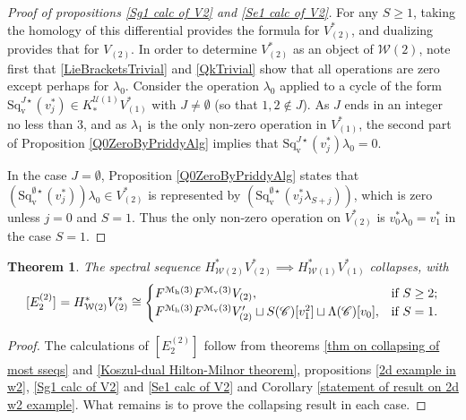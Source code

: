 \documentclass[11pt]{amsart} \renewcommand{\baselinestretch}{1.2}
\theoremstyle{plain}
\newtheorem{thm}{Theorem}[section] %
\numberwithin{equation}{section} %
\theoremstyle{plain}
\newtheorem{thm}{Theorem}[chapter] %
\numberwithin{equation}{chapter} %
\newcommand{\scrC}{\mathscr{C}}
\newcommand{\calU}{\mathcal{U}}
\newcommand{\calw}{\mathcal{W}}
\newcommand{\calmv}{\mathcal{M}\dver}
\newcommand{\calmh}{\mathcal{M}\dhor}
\newcommand{\CommOperad}{{\scrC}}
\newcommand{\E}[5]{[E^{#1}_{#2}#3]^{#4}_{#5}}
\newcommand{\dver}{_\mathrm{v}}
\newcommand{\dhor}{_\mathrm{h}}
\newcommand{\Sqvstar}[1]{\mathrm{Sq}\dver^{#1\star}}
\begin{document}
\begin{Calculations of HWn}
\begin{proof}[Proof of propositions \ref{Sg1 calc of V2} and \ref{Se1 calc of V2}]
For any $S\geq1$, taking the homology of this differential provides the formula for $V^*_{(2)}$, and dualizing provides that for $V_{(2)}$.
In order to determine $V^*_{(2)}$ as an object of $\calw(2)$, note first that \ref{LieBracketsTrivial} and \ref{QkTrivial} show that all operations are zero except perhaps for $\lambda_0$. %
Consider the operation $\lambda_0$ applied to a cycle of the form $\Sqvstar{J}(v_{j}^*)\in K_{*}^{\calU(1)}V^*_{(1)}$ with $J\neq\emptyset$ (so that $1,2\notin J$). As $J$ ends in an integer no less than 3, and as $\lambda_1$ is the only non-zero operation in $V^*_{(1)}$, the second part of Proposition \ref{Q0ZeroByPriddyAlg} implies that $\Sqvstar{J}(v_{j}^*)\lambda_0=0$.

In the case $J=\emptyset$, Proposition \ref{Q0ZeroByPriddyAlg} states that $(\Sqvstar{\emptyset}(v_{j}^*))\lambda_0\in V^*_{(2)}$ is represented by $(\Sqvstar{\emptyset}(v_{j}^*\lambda_{S+j}))$, which is zero unless $j=0$ and $S=1$. Thus the only non-zero operation on $V^*_{(2)}$ is $v_0^*\lambda_0=v_1^*$ in the case $S=1$.
\end{proof}
\begin{thm}
\label{W2 to W1 collapse}
The spectral sequence $H^*_{\calw(2)}V^*_{(2)}\implies H^*_{\calw(1)}V^*_{(1)}$ collapses, with
\[\E{(2)}{2}{}{}{}=H^*_{\calw(2)}V^*_{(2)}\cong\begin{cases}
F^{\calmh(3)}F^{\calmv(3)}V_{(2)},&\textup{if }S\geq2;\\
F^{\calmh(3)}F^{\calmv(3)}V'_{(2)}\sqcup S(\CommOperad) [v_1^{2}]\sqcup \Lambda(\CommOperad)[v_0],&\textup{if }S=1.
\end{cases}
\]
\end{thm}
\begin{proof}
The calculations of $\E{(2)}{2}{}{}{}$ follow from  theorems \ref{thm on collapsing of most sseqs} and \ref{Koszul-dual Hilton-Milnor theorem}, propositions \ref{2d example in w2}, \ref{Sg1 calc of V2} and \ref{Se1 calc of V2}  and Corollary \ref{statement of result on 2d w2 example}. What remains is to prove the collapsing result in each case.


\end{proof}
\end{Calculations of HWn}
\end{document}
